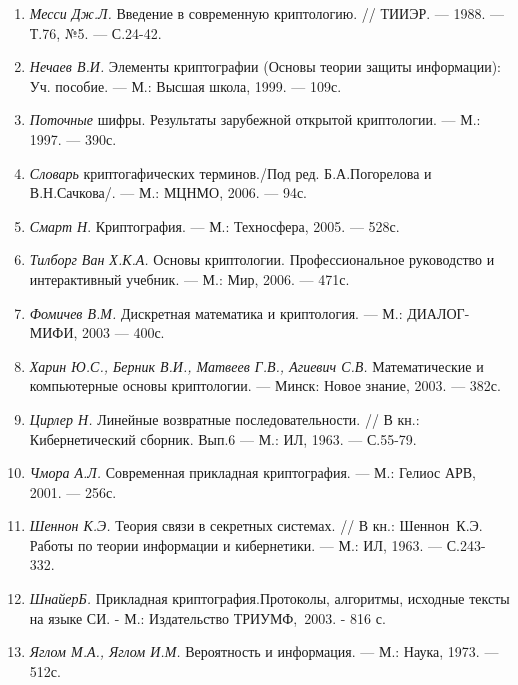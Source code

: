 {{{\begin{enumerate}
\begin{enumerate}
с англ. --- М.: Издательский дом «Вильямс»,  2005. --- 768с
\item \textit{Месси Дж.}\textit{Л.} Введение в современную
криптологию. // ТИИЭР. --- 1988. --- Т.76, №5. --- С.24-42.
\item \textit{ Н}\textit{ечаев В.И.} Элементы криптографии (Основы теории защиты
информации):  Уч.  пособие. --- М.: Высшая школа, 1999. --- 109с.
\item \textit{Поточные} шифры. Результаты зарубежной открытой
криптологии. --- М.: 1997. ---  390с. 
\item \textit{Словарь} криптогафических терминов./Под ред. Б.А.Погорелова и
В.Н.Сачкова/. --- М.: МЦНМО, 2006. --- 94с.
\item \textit{\textcolor[rgb]{0.2,0.2,0.2}{Смарт
Н}}\textcolor[rgb]{0.2,0.2,0.2}{. Криптография. }---
\textcolor[rgb]{0.2,0.2,0.2}{ М.: Техносфера, 2005. }---
\textcolor[rgb]{0.2,0.2,0.2}{ 528с.}
\item \textit{Тилборг Ван Х.К.А.} Основы криптологии. Профессиональное
руководство и интерактивный учебник. ---  М.: Мир, 2006. --- 471с.
\item \textit{Фомичев В.М.} Дискретная математика и криптология. --- М.:
ДИАЛОГ-МИФИ, 2003 --- 400с.
\item \textit{Харин Ю.С., Берник В.И., Матвеев Г.В., Агиевич С.В.
}Математические и компьютерные основы криптологии. --- Минск: Новое знание, 2003.
--- 382с.
\item \textit{Цирлер Н.} Линейные возвратные последовательности. // В кн.:
Кибернетический сборник. Вып.6 --- М.: ИЛ, 1963. --- С.55-79.
\item \textit{Чмора А.Л.} Современная прикладная криптография. ---  М.: Гелиос
АРВ,  2001. --- 256с.
\item \textit{Шеннон К.Э.} Теория связи в секретных системах. // В кн.:
Шеннон~К.Э. Работы по теории информации и кибернетики. --- М.: ИЛ, 1963. ---
С.243-332.
\item {\color[rgb]{0.2,0.2,0.2}
\textit{ШнайерБ. }Прикладная криптография.Протоколы, алгоритмы,\newline
исходные тексты на языке СИ. - М.: Издательство ТРИУМФ,~2003. - 816 с\textsf{.}}
\item \textit{Яглом М.А., Яглом И.М.} Вероятность и информация. --- М.: Наука,
1973. --- 512с. 
\end{enumerate}
\end{enumerate}

\bigskip


\bigskip

}}}
